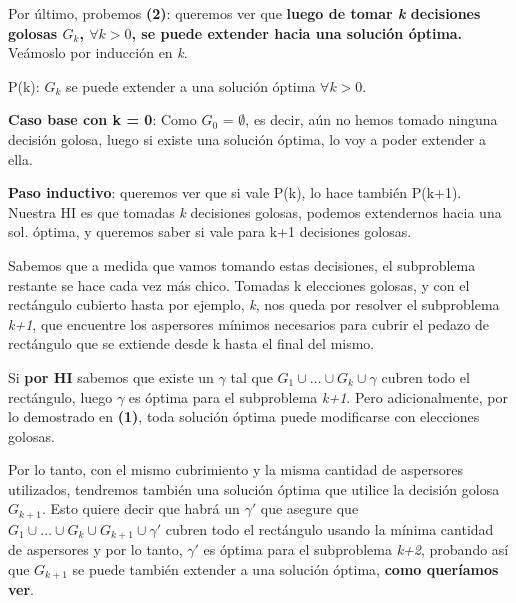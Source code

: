 \documentclass[./main.tex]{subfiles}
\begin{document}
Por último, probemos \textbf{(2)}: queremos ver que \textbf{luego de tomar \textit{k} decisiones golosas $G_{k}$, $\forall k > 0$, se puede extender hacia una solución óptima.} Veámoslo por inducción en \textit{k}. \newline 

P(k): $G_{k}$ se puede extender a una solución óptima $\forall k > 0$. \newline

\textbf{Caso base con k = 0}: Como $G_{0}$ = $\emptyset$, es decir, aún no hemos tomado ninguna decisión golosa, luego si existe una solución óptima, lo voy a poder extender a ella.  \newline

\textbf{Paso inductivo}: queremos ver que si vale P(k), lo hace también P(k+1). 
Nuestra HI es que tomadas \textit{k} decisiones golosas, podemos extendernos hacia una sol. óptima, y queremos saber si vale para k+1 decisiones golosas. \newline

Sabemos que a medida que vamos tomando estas decisiones, el subproblema restante se hace cada vez más chico. Tomadas k elecciones golosas, y con el rectángulo cubierto hasta por ejemplo, \textit{k}, nos queda por resolver el subproblema \textit{k+1}, que encuentre los aspersores mínimos necesarios para cubrir el pedazo de rectángulo que se extiende desde k hasta el final del mismo. \newline

Si \textbf{por HI} sabemos que existe un $\gamma$ tal que \(G_{1} \cup \ldots \cup G_{k} \cup \gamma\) cubren todo el rectángulo, luego $\gamma$ es óptima para el subproblema \textit{k+1}. Pero adicionalmente, por lo demostrado en \textbf{(1)}, toda solución óptima puede modificarse con elecciones golosas. \newline

Por lo tanto, con el mismo cubrimiento y la misma cantidad de aspersores utilizados, tendremos también una solución óptima que utilice la decisión golosa  $G_{k+1}$. Esto quiere decir que habrá un $ \gamma'$ que asegure que \(G_{1} \cup \ldots \cup G_{k} \cup G_{k+1} \cup \gamma'\) cubren todo el rectángulo usando la mínima cantidad de aspersores y por lo tanto, $ \gamma'$ es óptima para el subproblema \textit{k+2}, probando así que $G_{k+1}$ se puede también extender a una solución óptima, \textbf{como queríamos ver}.\done\newline\newline
\end{document}
